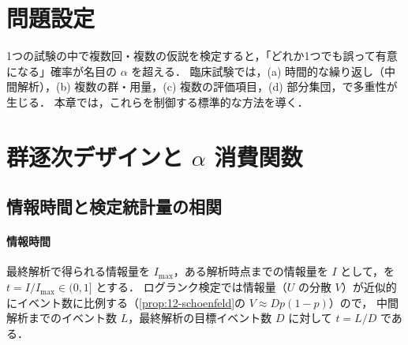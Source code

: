 \section{問題設定}\label{sec:14-setting}
1つの試験の中で複数回・複数の仮説を検定すると，「どれか1つでも誤って有意になる」確率が名目の $\alpha$ を超える．
臨床試験では，(a) 時間的な繰り返し（中間解析），(b) 複数の群・用量，(c) 複数の評価項目，(d) 部分集団，で多重性が生じる．
本章では，これらを制御する標準的な方法を導く．

\section{群逐次デザインと \texorpdfstring{$\alpha$}{α} 消費関数}\label{sec:14-gsd}
\Hinshutsu
\subsection{情報時間と検定統計量の相関}\label{subsec:14-info}
\paragraph{情報時間}
最終解析で得られる情報量を $I_{\max}$，ある解析時点までの情報量を $I$ として，を $t=I/I_{\max}\in(0,1]$ とする．
ログランク検定では情報量（$U$ の分散 $V$）が近似的にイベント数に比例する（\cref{prop:12-schoenfeld}の $V\approx Dp(1-p)$）ので，
中間解析までのイベント数 $L$，最終解析の目標イベント数 $D$ に対して $t=L/D$ である．

